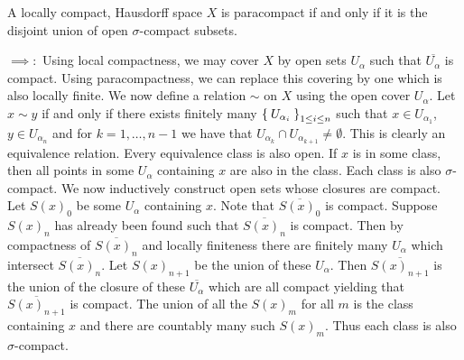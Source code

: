 \documentclass[letterpaper, 11pt, oneside]{book}
\begin{document}
\begin{thrm}\label{thrm: paracompact_iff_union_sigma_compact}
  A locally compact, Hausdorff space $X$ is paracompact if and only if it is the disjoint union of open $\sigma$-compact subsets.
\end{thrm}
\begin{pf}
  $\implies\colon$ Using local compactness, we may cover $X$ by open sets $U_{\alpha}$ such that $\overline{U_{\alpha}}$ is compact.
  Using paracompactness, we can replace this covering by one which is also locally finite.
  We now define a relation $\sim$ on $X$ using the open cover $U_{\alpha}$.
  Let $x \sim y$ if and only if there exists finitely many $\Set{U_{\alpha_i}}_{1 \leq i \leq n}$ such that $x \in U_{\alpha_{1}}$, $y \in U_{\alpha_{n}}$ and for $k = 1, \ldots, n - 1$ we have that $U_{\alpha_{k}} \cap U_{\alpha_{k + 1}} \neq \emptyset$.
  This is clearly an equivalence relation.
  Every equivalence class is also open.
  If $x$ is in some class, then all points in some $U_{\alpha}$ containing $x$ are also in the class.
  Each class is also $\sigma$-compact.
  We now inductively construct open sets whose closures are compact.
  Let $S(x)_{0}$ be some $U_{\alpha}$ containing $x$.
  Note that $\overline{S(x)_{0}}$ is compact.
  Suppose $S(x)_{n}$ has already been found such that $\overline{S(x)_{n}}$ is compact.
  Then by compactness of $\overline{S(x)_{n}}$ and locally finiteness there are finitely many $U_{\alpha}$ which intersect $\overline{S(x)_{n}}$.
  Let $S(x)_{n + 1}$ be the union of these $U_{\alpha}$.
  Then $\overline{S(x)_{n + 1}}$ is the union of the closure of these $\overline{U_{\alpha}}$ which are all compact yielding that $\overline{S(x)_{n + 1}}$ is compact.
  The union of all the $S(x)_{m}$ for all $m$ is the class containing $x$ and there are countably many such $S(x)_{m}$.
  Thus each class is also $\sigma$-compact.


\end{pf}
\end{document}
